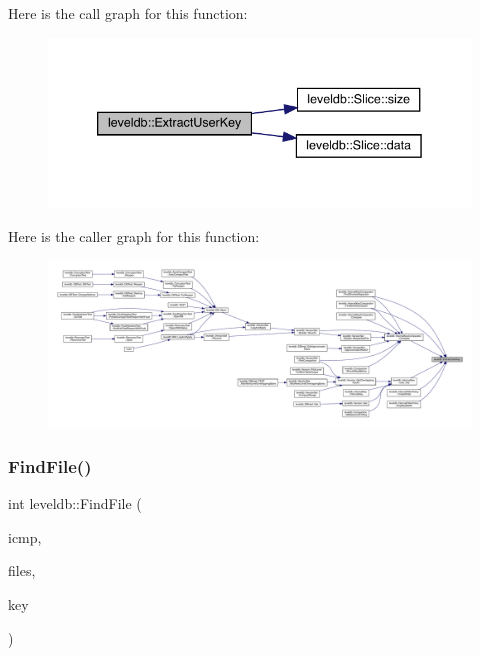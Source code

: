 Here is the call graph for this function\+:
\nopagebreak
\begin{figure}[H]
\begin{center}
\leavevmode
\includegraphics[width=339pt]{namespaceleveldb_a1c889869840312393b805ad91a41b94f_cgraph}
\end{center}
\end{figure}
Here is the caller graph for this function\+:
\nopagebreak
\begin{figure}[H]
\begin{center}
\leavevmode
\includegraphics[width=350pt]{namespaceleveldb_a1c889869840312393b805ad91a41b94f_icgraph}
\end{center}
\end{figure}
\mbox{\label{namespaceleveldb_a812c4c6cf8299e767535a59f2205df0c}} 
\subsubsection{\texorpdfstring{FindFile()}{FindFile()}}
{\footnotesize\ttfamily int leveldb\+::\+Find\+File (\begin{DoxyParamCaption}\item[{const \mbox{\hyperlink{classleveldb_1_1_internal_key_comparator}{Internal\+Key\+Comparator}} \&}]{icmp,  }\item[{const std\+::vector$<$ \mbox{\hyperlink{structleveldb_1_1_file_meta_data}{File\+Meta\+Data}} $\ast$ $>$ \&}]{files,  }\item[{const \mbox{\hyperlink{classleveldb_1_1_slice}{Slice}} \&}]{key }\end{DoxyParamCaption})}

